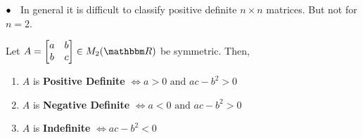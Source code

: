 \documentclass[Analysis-3]{subfiles}
\begin{document}
$\bullet \hspace{2mm} $ In general it is difficult to classify positive definite $n \times n$ matrices. But not for $n = 2$.

\begin{Thm}{}{}
    Let $A = \begin{bmatrix}
            a & b \\
            b & c
        \end{bmatrix} \in M_2(\R) $ be symmetric. Then,
    \begin{enumerate}
        \item $A$ is \textbf{Positive Definite} $ \Longleftrightarrow a > 0 \text{ and } ac -b^2 >0 $
        \item $A$ is \textbf{Negative Definite} $ \Longleftrightarrow a < 0 \text{ and } ac -b^2 >0 $
        \item $A$ is \textbf{Indefinite} $ \Longleftrightarrow ac -b^2 <0 $
    \end{enumerate}
\end{Thm}
\end{document}
